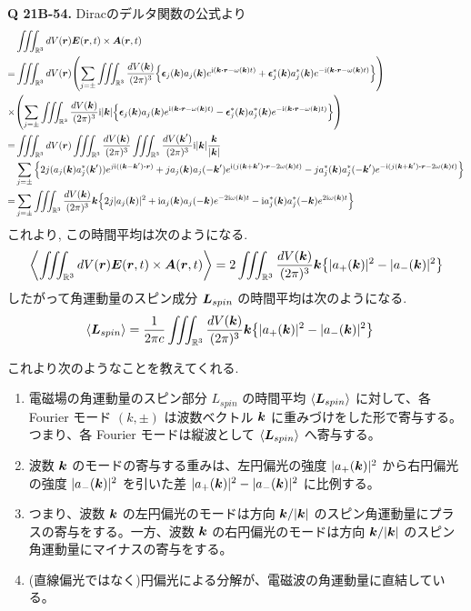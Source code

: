 \documentclass[a4paper,dvipdfmx]{jsarticle}
\theoremstyle{definition}
\begin{document}
\textbf{Q 21B-54.}
Diracのデルタ関数の公式より
\begin{align}
         & \iiint_{\RR^3}dV(\rr)\EE(\rr, t)\times\AA(\rr, t)                                                                                                                                                                    \\
  =      & \iiint_{\RR^3}dV(\rr)\qty(\sum_{j=\pm}\iiint_{\RR^3}\frac{dV(\kk)}{(2\pi)^3}\qty{\ee_j(\kk)a_j(\kk)e^{\ii(\kk\vdot\rr - \omega(\kk)t)} + \ee_j^*(\kk)a_j^*(\kk)e^{-\ii(\kk\vdot\rr - \omega(\kk)t)}})                \\
  \times & \qty(\sum_{j=\pm}\iiint_{\RR^3}\frac{dV(\kk)}{(2\pi)^3}\ii|\kk|\qty{\ee_j(\kk)a_j(\kk)e^{\ii(\kk\vdot\rr - \omega(\kk)t)} - \ee_j^*(\kk)a_j^*(\kk)e^{-\ii(\kk\vdot\rr - \omega(\kk)t)}})                             \\
  =      & \iiint_{\RR^3}dV(\rr)\iiint_{\RR^3}\frac{dV(\kk)}{(2\pi)^3}\iiint_{\RR^3}\frac{dV(\kk')}{(2\pi)^3}\ii|\kk|\frac{\kk}{|\kk|}                                                                                          \\
         & \sum_{j=\pm}\qty{2j(a_j(\kk)a_j^*(\kk'))e^{j\ii((\kk - \kk')\vdot\rr)} + ja_j(\kk)a_j(-\kk')e^{\ii(j(\kk + \kk')\vdot\rr - 2\omega(\kk)t)} - ja_j^*(\kk)a_j^*(-\kk')e^{-\ii(j(\kk + \kk')\vdot\rr - 2\omega(\kk)t)}} \\
  =      & \sum_{j=\pm}\iiint_{\RR^3}\frac{dV(\kk)}{(2\pi)^3}\kk\qty{2j|a_j(\kk)|^2 + \ii a_j(\kk)a_j(-\kk)e^{-2\ii\omega(\kk)t} - \ii a_j^*(\kk)a_j^*(-\kk)e^{2\ii\omega(\kk)t}}
\end{align}
これより, この時間平均は次のようになる.
\begin{align}
  \left\langle\iiint_{\mathbb{R}^3}dV(\vb*{r})\vb*{E}(\vb*{r}, t)\times\vb*{A}(\vb*{r}, t)\right\rangle = 2\iiint_{\mathbb{R}^3}\frac{dV(\vb*{k})}{(2\pi)^3}\vb*{k}\qty{|a_+(\vb*{k})|^2 - |a_-(\vb*{k})|^2}
\end{align}
したがって角運動量のスピン成分 $\vb*{L}_{spin}$ の時間平均は次のようになる.
\begin{align}
  \langle\vb*{L}_{spin}\rangle & = \frac{1}{2\pi c}\iiint_{\mathbb{R}^3}\frac{dV(\vb*{k})}{(2\pi)^3}\vb*{k}\qty{|a_+(\vb*{k})|^2 - |a_-(\vb*{k})|^2}
\end{align}

これより次のようなことを教えてくれる.
\begin{enumerate}
  \item 電磁場の角運動量のスピン部分 $L_{spin}$ の時間平均 $\langle\vb*{L}_{spin}\rangle$ に対して、各 Fourier モード $(k, \pm)$ は波数ベクトル $\vb*{k}$ に重みづけをした形で寄与する。つまり、各 Fourier モードは縦波として $\langle\vb*{L}_{spin}\rangle$ へ寄与する。
  \item 波数 $\vb*{k}$ のモードの寄与する重みは、左円偏光の強度 $|a_+(\vb*{k})|^2$ から右円偏光の強度 $|a_-(\vb*{k})|^2$ を引いた差 $|a_+(\vb*{k})|^2 - |a_-(\vb*{k})|^2$ に比例する。
  \item つまり、波数 $\vb*{k}$ の左円偏光のモードは方向 $\vb*{k}/|\vb*{k}|$ のスピン角運動量にプラスの寄与をする。一方、波数 $\vb*{k}$ の右円偏光のモードは方向 $\vb*{k}/|\vb*{k}|$ のスピン角運動量にマイナスの寄与をする。
  \item (直線偏光ではなく)円偏光による分解が、電磁波の角運動量に直結している。
\end{enumerate}
\end{document}
